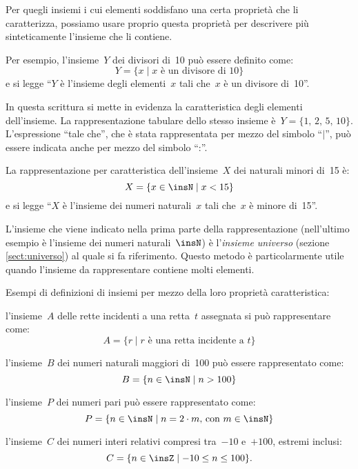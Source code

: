 Per quegli insiemi i cui elementi soddisfano una certa proprietà che
li caratterizza, possiamo usare proprio questa proprietà per
descrivere più sinteticamente l'insieme che li contiene.

Per esempio, l'insieme~$Y$ dei divisori di~10 può essere definito come: \[Y=\{x\mid x \text{ è un divisore di }10\}\]
e si legge ``$Y$ è l'insieme degli elementi~$x$ tali che~$x$ è un divisore di~10''.

In questa scrittura si mette in evidenza la caratteristica degli elementi dell'insieme.
La rappresentazione tabulare dello stesso insieme è~$Y=\{\text{1, 2, 5, 10}\}$. L'espressione ``tale che'', che è stata rappresentata per mezzo del simbolo ``$|$'', può essere indicata anche per mezzo del simbolo ``:''.

La rappresentazione per caratteristica dell'insieme~$X$
dei naturali minori di~15 è: \[X=\{x\in\insN\mid x<15\}\]
e si legge ``$X$ è l'insieme dei numeri naturali~$x$ tali che~$x$ è minore di~15''.

L'insieme che viene indicato nella prima parte della rappresentazione (nell'ultimo esempio è
l'insieme dei numeri naturali~$\insN$) è l'\textit{insieme universo} (sezione \ref{sect:universo}) al quale si fa riferimento.
Questo metodo è particolarmente utile quando l'insieme da rappresentare contiene molti elementi.

\begin{exrig}
 \begin{esempio}
 Esempi di definizioni di insiemi per mezzo della loro proprietà caratteristica:
 \begin{enumeratea}
\item l'insieme~$A$ delle rette incidenti a una retta~$t$ assegnata si può rappresentare come:
\[A=\{r\mid r\text{ è una retta incidente a } t\}\]
\item l'insieme~$B$ dei numeri naturali maggiori di~100 può essere rappresentato come:
\[B=\{n\in\insN\mid n>100\}\]
\item l'insieme~$P$ dei numeri pari può essere rappresentato come:
\[P=\{n\in\insN\mid n=2\cdot m\text{, con }m\in\insN\}\]
\item l'insieme~$C$ dei numeri interi relativi compresi tra~$-10$ e~$+100$, estremi inclusi:
\[C=\{n\in\insZ\mid -10\le n\le 100\}.\]
\end{enumeratea}
 \end{esempio}
\end{exrig}

\ovalbox{\risolvii \ref{ese:\thechapter.19}, \ref{ese:\thechapter.20}, \ref{ese:\thechapter.21}, \ref{ese:\thechapter.22}, \ref{ese:\thechapter.23}, \ref{ese:\thechapter.24}, \ref{ese:\thechapter.25}, \ref{ese:\thechapter.26}, \ref{ese:\thechapter.27}, \ref{ese:\thechapter.28}, \ref{ese:\thechapter.29},%
\ref{ese:\thechapter.30}, \ref{ese:\thechapter.31}, \ref{ese:\thechapter.32}}

